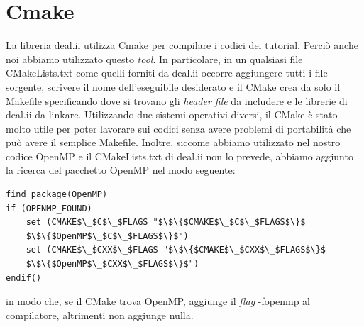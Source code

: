 \documentclass[a4paper,10pt]{report}
\theoremstyle{plain}
\theoremstyle{definition}
\theoremstyle{remark}
\begin{document}
\section{\textsf{Cmake}}
La libreria \textsf{deal.ii} utilizza \textsf{Cmake} per compilare i codici dei tutorial. Perci\`o anche noi abbiamo utilizzato questo \emph{tool}. In particolare, in un qualsiasi file \textsf{CMakeLists.txt} come quelli forniti da \textsf{deal.ii} occorre aggiungere tutti i file sorgente, scrivere il nome dell'eseguibile desiderato e il \textsf{CMake} crea da solo il \textsf{Makefile} specificando dove si trovano gli \emph{header file} da includere e le librerie di \textsf{deal.ii} da linkare. Utilizzando due sistemi operativi diversi, il \textsf{CMake} \`e stato molto utile per poter lavorare sui codici senza avere problemi di portabilit\`a che pu\`o avere il semplice \textsf{Makefile}. Inoltre, siccome abbiamo utilizzato nel nostro codice \textsf{OpenMP} e il \textsf{CMakeLists.txt} di \textsf{deal.ii} non lo prevede, abbiamo aggiunto la ricerca del pacchetto \textsf{OpenMP} nel modo seguente:
\begin{lstlisting}
find_package(OpenMP)
if (OPENMP_FOUND)
    set (CMAKE$\_$C$\_$FLAGS "$\$\{$CMAKE$\_$C$\_$FLAGS$\}$
	$\$\{$OpenMP$\_$C$\_$FLAGS$\}$")
    set (CMAKE$\_$CXX$\_$FLAGS "$\$\{$CMAKE$\_$CXX$\_$FLAGS$\}$
	$\$\{$OpenMP$\_$CXX$\_$FLAGS$\}$")
endif()
\end{lstlisting}
in modo che, se il \textsf{CMake} trova \textsf{OpenMP}, aggiunge il \emph{flag} \textsf{-fopenmp} al compilatore, altrimenti non aggiunge nulla.\\

\end{document}
